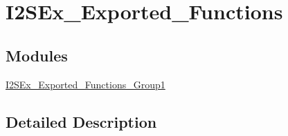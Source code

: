 \hypertarget{group___i2_s_ex___exported___functions}{}\section{I2\+S\+Ex\+\_\+\+Exported\+\_\+\+Functions}
\label{group___i2_s_ex___exported___functions}
\subsection*{Modules}
\begin{DoxyCompactItemize}
\item 
\hyperlink{group___i2_s_ex___exported___functions___group1}{I2\+S\+Ex\+\_\+\+Exported\+\_\+\+Functions\+\_\+\+Group1}
\end{DoxyCompactItemize}


\subsection{Detailed Description}
